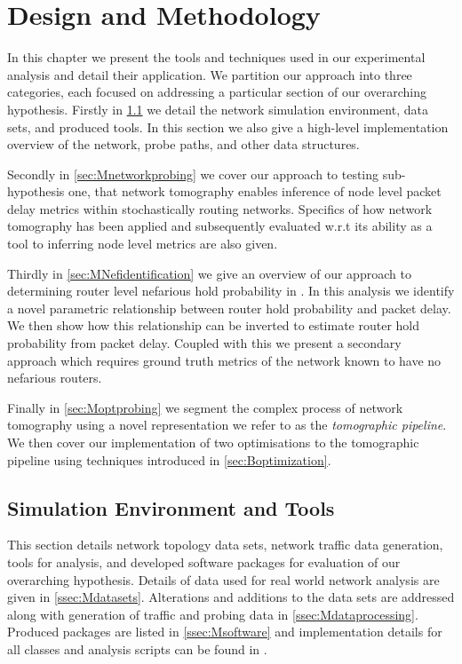 \chapter{Design and Methodology}
\label{cha:methodology}
In this chapter we present the tools and techniques used in our experimental analysis and detail their application. We partition our approach into three categories, each focused on addressing a particular section of our overarching hypothesis. Firstly in \cref{sec:Msimenvironment} we detail the network simulation environment, data sets, and produced tools. In this section we also give a high-level implementation overview of the network, probe paths, and other data structures.\par
Secondly in \cref{sec:Mnetworkprobing} we cover our approach to testing sub-hypothesis one, that network tomography enables inference of node level packet delay metrics within stochastically routing networks. Specifics of how network tomography has been applied and subsequently evaluated w.r.t its ability as a tool to inferring node level metrics are also given.\par
Thirdly in \cref{sec:MNefidentification} we give an overview of our approach to determining router level nefarious hold probability in . In this analysis we identify a novel parametric relationship between router hold probability and packet delay. We then show how this relationship can be inverted to estimate router hold probability from packet delay. Coupled with this we present a secondary approach which requires ground truth metrics of the network known to have no nefarious routers.\par
Finally in \cref{sec:Moptprobing} we segment the complex process of network tomography using a novel representation we refer to as the \textit{tomographic pipeline}. We then cover our implementation of two optimisations to the tomographic pipeline using techniques introduced in \cref{sec:Boptimization}.

\section{Simulation Environment and Tools}
\label{sec:Msimenvironment}
This section details network topology data sets, network traffic data generation, tools for analysis, and developed software packages for evaluation of our overarching hypothesis. Details of data used for real world network analysis are given in \cref{ssec:Mdatasets}. Alterations and additions to the data sets are addressed along with generation of traffic and probing data in \cref{ssec:Mdataprocessing}. Produced packages are listed in \cref{ssec:Msoftware} and implementation details for all classes and analysis scripts can be found in \cite{sylvester_millar_real_2021}.

